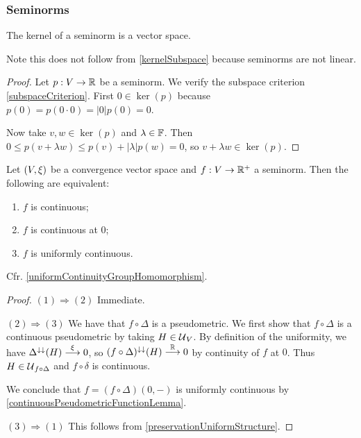 \subsubsection{Seminorms}
\begin{lemma}
The kernel of a seminorm is a vector space.
\end{lemma}
Note this does not follow from \ref{kernelSubspace} because seminorms are not linear.
\begin{proof}
Let $p:V\to \mathbb{R}$ be a seminorm. We verify the subspace criterion \ref{subspaceCriterion}. First $0\in\ker(p)$ because $p(0) = p(0\cdot 0) = |0|p(0) = 0$.

Now take $v,w\in \ker(p)$ and $\lambda\in \mathbb{F}$. Then $0\leq p(v+\lambda w) \leq p(v)+|\lambda|p(w) = 0$, so $v+\lambda w\in\ker(p)$.
\end{proof}

\begin{proposition} \label{uniformContinuitySeminorms}
Let $\left( V,\xi \right)$ be a convergence vector space and $f: V\to \mathbb{R}^+$ a seminorm. Then the following are equivalent:
\begin{enumerate}
\item $f$ is continuous;
\item $f$ is continuous at $0$;
\item $f$ is uniformly continuous.
\end{enumerate}
\end{proposition}
Cfr. \ref{uniformContinuityGroupHomomorphism}.
\begin{proof}
$(1) \Rightarrow (2)$ Immediate.

$(2) \Rightarrow (3)$ We have that $f\circ \Delta$ is a pseudometric. We first show that $f\circ \Delta$ is a continuous pseudometric by taking $H\in \operatorname{\mathcal{U}}_V$. By definition of the uniformity, we have $\Delta^{\downarrow\downarrow}(H)\overset{\xi}{\longrightarrow} 0$, so $(f\circ \Delta)^{\downarrow\downarrow}(H) \overset{\mathbb{R}}{\longrightarrow} 0$ by continuity of $f$ at $0$. Thus $H\in \operatorname{\mathcal{U}}_{f\circ \Delta}$ and $f\circ \delta$ is continuous.

We conclude that $f = (f\circ \Delta)(0,-)$ is uniformly continuous by \ref{continuousPseudometricFunctionLemma}.

$(3) \Rightarrow (1)$ This follows from \ref{preservationUniformStructure}.
\end{proof}

